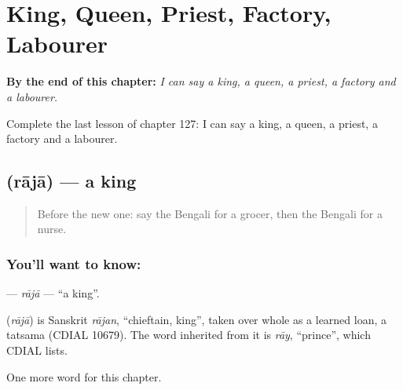 
\chapter{King, Queen, Priest, Factory, Labourer}
\label{ch:bn-king-queen-priest-factory-labourer}

\begin{chapteropening}
\textbf{By the end of this chapter:} \emph{I can say a king, a queen, a priest, a factory and a labourer.}

Complete the last lesson of chapter 127: I can say a king, a queen, a priest, a factory and a labourer.
\end{chapteropening}

\section[\texorpdfstring{\bn{রাজা} (rājā)}{রাজা (rājā)}]{ (rājā) — a king}

\label{lesson:BN-C127-raja}



\begin{quote}
Before the new one: say the Bengali for a grocer, then the Bengali for a nurse.
\end{quote}

\subsection*{You'll want to know: }
\textbf{} — \emph{rājā} — \textquotedblleft{}a king\textquotedblright{}.

\begin{cousinweb}
\textbf{} (\emph{rājā}) is Sanskrit \emph{rājan}, \textquotedblleft{}chieftain, king\textquotedblright{}, taken over whole as a learned loan, a tatsama (CDIAL 10679). The word inherited from it is \emph{rāy}, \textquotedblleft{}prince\textquotedblright{}, which CDIAL lists.
\end{cousinweb}

\begin{grammarlens}[title={What you've built}]
One more word for this chapter.
\end{grammarlens}

